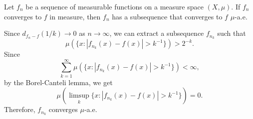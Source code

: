 \documentclass{../crs}
\begin{document}
\begin{thm}
Let $f_n$ be a sequence of measurable functions on a measure space $(X,\mu)$.
If $f_n$ converges to $f$ in measure, then $f_n$ has a subsequence that converges to $f$ $\mu$-a.e.
\end{thm}
\begin{pf}
Since $d_{f_n-f}(1/k)\to0$ as $n\to\infty$, we can extract a subsequence $f_{n_k}$ such that
\[\mu(\{x:|f_{n_k}(x)-f(x)|>k^{-1}\})>2^{-k}.\]
Since
\[\sum_{k=1}^\infty\mu(\{x:|f_{n_k}(x)-f(x)|>k^{-1}\})<\infty,\]
by the Borel-Canteli lemma, we get
\[\mu(\limsup_k\{x:|f_{n_k}(x)-f(x)|>k^{-1}\})=0.\]
Therefore, $f_{n_k}$ converges $\mu$-a.e.
\end{pf}
\end{document}
